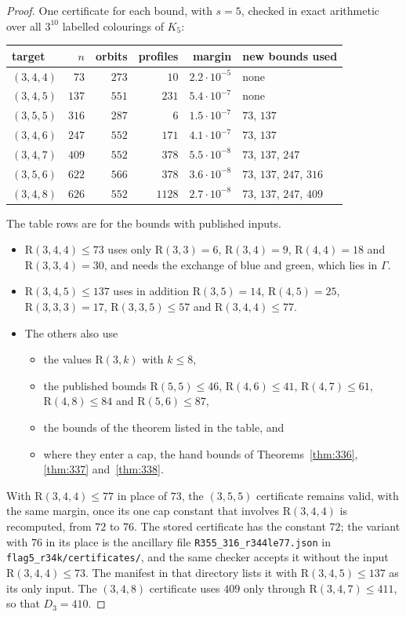 \documentclass[11pt]{article}
\theoremstyle{spacedplain}
\theoremstyle{spaceddef}
\theoremstyle{spacedremark}
\newcommand{\R}{\mathrm{R}}
\begin{document}
\begin{proof}
One certificate for each bound, with $s=5$, checked in exact arithmetic over all $3^{10}$ labelled colourings of $K_5$:
\begin{center}\small
\begin{tabular}{lrrrrl}
\toprule
target & $n$ & orbits & profiles & margin & new bounds used\\
\midrule
$(3,4,4)$ & $73$ & $273$ & $10$ & $2.2\cdot10^{-5}$ & none\\
$(3,4,5)$ & $137$ & $551$ & $231$ & $5.4\cdot10^{-7}$ & none\\
$(3,5,5)$ & $316$ & $287$ & $6$ & $1.5\cdot10^{-7}$ & $73$, $137$\\
$(3,4,6)$ & $247$ & $552$ & $171$ & $4.1\cdot10^{-7}$ & $73$, $137$\\
$(3,4,7)$ & $409$ & $552$ & $378$ & $5.5\cdot10^{-8}$ & $73$, $137$, $247$\\
$(3,5,6)$ & $622$ & $566$ & $378$ & $3.6\cdot10^{-8}$ & $73$, $137$, $247$, $316$\\
$(3,4,8)$ & $626$ & $552$ & $1128$ & $2.7\cdot10^{-8}$ & $73$, $137$, $247$, $409$\\
\bottomrule
\end{tabular}
\end{center}
The table rows are for the bounds with published inputs.
\begin{itemize}
\item $\R(3,4,4)\le 73$ uses only $\R(3,3)=6$, $\R(3,4)=9$, $\R(4,4)=18$ and $\R(3,3,4)=30$, and needs the exchange of blue and green, which lies in $\Gamma$.
\item $\R(3,4,5)\le 137$ uses in addition $\R(3,5)=14$, $\R(4,5)=25$, $\R(3,3,3)=17$, $\R(3,3,5)\le 57$ and $\R(3,4,4)\le 77$.
\item The others also use
\begin{itemize}
\item the values $\R(3,k)$ with $k\le 8$,
\item the published bounds $\R(5,5)\le 46$, $\R(4,6)\le 41$, $\R(4,7)\le 61$, $\R(4,8)\le 84$ and $\R(5,6)\le 87$,
\item the bounds of the theorem listed in the table, and
\item where they enter a cap, the hand bounds of Theorems~\ref{thm:336}, \ref{thm:337} and~\ref{thm:338}.
\end{itemize}
\end{itemize}
With $\R(3,4,4)\le 77$ in place of $73$, the $(3,5,5)$ certificate remains valid, with the same margin, once its one cap constant that involves $\R(3,4,4)$ is recomputed, from $72$ to $76$.
The stored certificate has the constant $72$; the variant with $76$ in its place is the ancillary file \texttt{R355\_316\_r344le77.json} in \texttt{flag5\_r34k/certificates/}, and the same checker accepts it without the input $\R(3,4,4)\le 73$.
The manifest in that directory lists it with $\R(3,4,5)\le 137$ as its only input.
The $(3,4,8)$ certificate uses $409$ only through $\R(3,4,7)\le 411$, so that $D_3=410$.


\end{proof}
\end{document}
